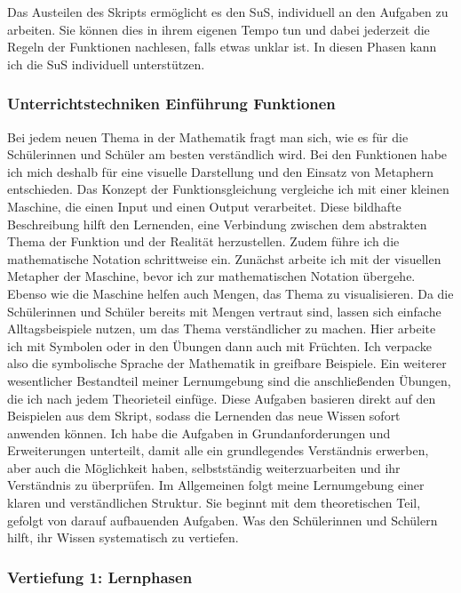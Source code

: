 \documentclass[
  10pt,
  a4paper,
  DIV=11]{scrartcl}
\theoremstyle{definition}
\theoremstyle{remark}
\begin{document}
\begin{tcolorbox}
Das Austeilen des Skripts ermöglicht es den SuS, individuell an den
Aufgaben zu arbeiten. Sie können dies in ihrem eigenen Tempo tun und
dabei jederzeit die Regeln der Funktionen nachlesen, falls etwas unklar
ist. In diesen Phasen kann ich die SuS individuell unterstützen.

\subsubsection{Unterrichtstechniken Einführung
Funktionen}\label{unterrichtstechniken-einfuxfchrung-funktionen}

Bei jedem neuen Thema in der Mathematik fragt man sich, wie es für die
Schülerinnen und Schüler am besten verständlich wird. Bei den Funktionen
habe ich mich deshalb für eine visuelle Darstellung und den Einsatz von
Metaphern entschieden. Das Konzept der Funktionsgleichung vergleiche ich
mit einer kleinen Maschine, die einen Input und einen Output
verarbeitet. Diese bildhafte Beschreibung hilft den Lernenden, eine
Verbindung zwischen dem abstrakten Thema der Funktion und der Realität
herzustellen. Zudem führe ich die mathematische Notation schrittweise
ein. Zunächst arbeite ich mit der visuellen Metapher der Maschine, bevor
ich zur mathematischen Notation übergehe. Ebenso wie die Maschine helfen
auch Mengen, das Thema zu visualisieren. Da die Schülerinnen und Schüler
bereits mit Mengen vertraut sind, lassen sich einfache Alltagsbeispiele
nutzen, um das Thema verständlicher zu machen. Hier arbeite ich mit
Symbolen oder in den Übungen dann auch mit Früchten. Ich verpacke also
die symbolische Sprache der Mathematik in greifbare Beispiele. Ein
weiterer wesentlicher Bestandteil meiner Lernumgebung sind die
anschließenden Übungen, die ich nach jedem Theorieteil einfüge. Diese
Aufgaben basieren direkt auf den Beispielen aus dem Skript, sodass die
Lernenden das neue Wissen sofort anwenden können. Ich habe die Aufgaben
in Grundanforderungen und Erweiterungen unterteilt, damit alle ein
grundlegendes Verständnis erwerben, aber auch die Möglichkeit haben,
selbstständig weiterzuarbeiten und ihr Verständnis zu überprüfen. Im
Allgemeinen folgt meine Lernumgebung einer klaren und verständlichen
Struktur. Sie beginnt mit dem theoretischen Teil, gefolgt von darauf
aufbauenden Aufgaben. Was den Schülerinnen und Schülern hilft, ihr
Wissen systematisch zu vertiefen.

\subsubsection{Vertiefung 1: Lernphasen}\label{vertiefung-1-lernphasen}


\end{tcolorbox}
\end{document}

